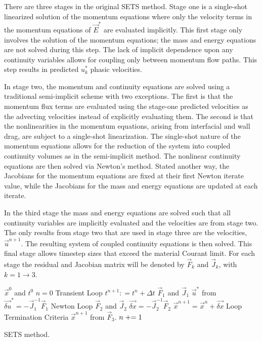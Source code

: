 There are three stages in the original SETS method.
Stage one is a single-shot linearized solution of the momentum equations where only the velocity terms in the momentum equations of $\vec{E}^{*}$ are evaluated implicitly.
This first stage only involves the solution of the momentum equations; the mass and energy equations are not solved during this step.
The lack of implicit dependence upon any continuity variables allows for coupling only between momentum flow paths.
This step results in predicted $u^{*}_{k}$ phasic velocities.

In stage two, the momentum and continuity equations are solved using a traditional semi-implicit scheme with two exceptions.
The first is that the momentum flux terms are evaluated using the stage-one predicted velocities as the advecting velocities instead of explicitly evaluating them.
The second is that the nonlinearities in the momentum equations, arising from interfacial and wall drag, are subject to a single-shot linearization.
The single-shot nature of the momentum equations allows for the reduction of the system into coupled continuity volumes as in the semi-implicit method.
The nonlinear continuity equations are then solved via Newton's method.
Stated another way, the Jacobians for the momentum equations are fixed at their first Newton iterate value, while the Jacobians for the mass and energy equations are updated at each iterate.

In the third stage the mass and energy equations are solved such that all continuity variables are implicitly evaluated and the velocities are from stage two.
The only results from stage two that are used in stage three are the velocities, $\vec{u}^{n+1}$.
The resulting system of coupled continuity equations is then solved.
This final stage allows timestep sizes that exceed the material Courant limit.
For each stage the residual and Jacobian matrix will be denoted by $\vec{F}_k$ and $\vec{J}_k$, with $k = 1 \to 3$.

\begin{algo}[ht!]
\setlength{\baselineskip}{0.625\baselineskip}
\begin{algorithmic}[1]
\Require $\vec{x}^{0}$ and $t^{0}$
\Set $n = 0$
\Loop \; Transient Loop
    \Set $t^{n+1} : = t^{n} + \Delta t$
	\Calculate $\vec{F}_1$ and $\vec{J}_1$
	\Calculate $\vec{u}^{*}$ from $\vec{\delta u}^{*} = -\vec{J}^{-1}_1\vec{F}_1$
	\Loop \; Newton Loop
		\Calculate $\vec{F}_2$ and $\vec{J}_2$
		\BlackBox $\vec{\delta x} = - \vec{J}_2^{-1}\vec{F}_2$
		\Calculate $\vec{x}^{n+1} = \vec{x}^{n} + \vec{\delta x}$
		\BlackBox Loop Termination Criteria
	\EndLoop
	\Calculate $\vec{x}^{n+1}$ from $\vec{F}_3$.
	\Set $n \mathrel{+}= 1$
\EndLoop
\end{algorithmic}
\caption{SETS method.}
\label{alg:sets}
\end{algo}

